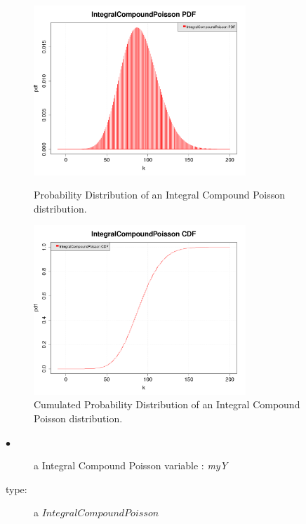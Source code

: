 \begin{figure}[hbtp]
  \begin{minipage}{8cm}
    \begin{center}
      \includegraphics[width=8cm]{ICP_PDF.png} 
      \caption{Probability Distribution of an Integral Compound Poisson distribution.}
      \label{ICP_PDF}
    \end{center}
  \end{minipage}
  \hfill
  \begin{minipage}{8cm}
    \begin{center}
      \includegraphics[width=8cm]{ICP_CDF.png} 
      \caption{Cumulated Probability Distribution of an Integral Compound Poisson distribution.}
      \label{ICP_CDF}
    \end{center}
  \end{minipage}
\end{figure}






\espace

{
  \begin{description}
  \item[$\bullet$] a Integral Compound Poisson variable  : {\itshape myY}
  \item[type:] a $IntegralCompoundPoisson$
  \end{description}
}

